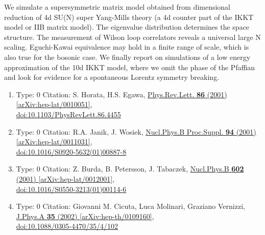 \documentclass[a4paper,10pt]{article}
\begin{document}
\begin{enumerate}
We simulate a supersymmetric matrix model obtained from dimensional reduction of 4d SU(N) super Yang-Mills theory (a 4d counter part of the IKKT model or IIB matrix model). The eigenvalue distribution determines the space structure. The measurement of Wilson loop correlators reveals a universal large N scaling. Eguchi-Kawai equivalence may hold in a finite range of scale, which is also true for the bosonic case. We finally report on simulations of a low energy approximation of the 10d IKKT model, where we omit the phase of the Pfaffian and look for evidence for a spontaneous Lorentz symmetry breaking.
\begin{enumerate}
  \item Type: 0 Citation: S. Horata, H.S. Egawa, \href{https://www.doi.org/10.1103/PhysRevLett.86.4455}{Phys.Rev.Lett. {\bf 86} (2001) }  \href{https://arxiv.org/abs/hep-lat/0010051}{[arXiv:hep-lat/0010051]},\\\href{https://www.doi.org/10.1103/PhysRevLett.86.4455}{doi:10.1103/PhysRevLett.86.4455}
  \item Type: 0 Citation: R.A. Janik, J. Wosiek, \href{https://www.doi.org/10.1016/S0920-5632(01)00887-8}{Nucl.Phys.B Proc.Suppl. {\bf 94} (2001) }  \href{https://arxiv.org/abs/hep-lat/0011031}{[arXiv:hep-lat/0011031]},\\\href{https://www.doi.org/10.1016/S0920-5632(01)00887-8}{doi:10.1016/S0920-5632(01)00887-8}
  \item Type: 0 Citation: Z. Burda, B. Petersson, J. Tabaczek, \href{https://www.doi.org/10.1016/S0550-3213(01)00114-6}{Nucl.Phys.B {\bf 602} (2001) }  \href{https://arxiv.org/abs/hep-lat/0012001}{[arXiv:hep-lat/0012001]},\\\href{https://www.doi.org/10.1016/S0550-3213(01)00114-6}{doi:10.1016/S0550-3213(01)00114-6}
  \item Type: 0 Citation: Giovanni M. Cicuta, Luca Molinari, Graziano Vernizzi, \href{https://www.doi.org/10.1088/0305-4470/35/4/102}{J.Phys.A {\bf 35} (2002) }  \href{https://arxiv.org/abs/hep-th/0109160}{[arXiv:hep-th/0109160]},\\\href{https://www.doi.org/10.1088/0305-4470/35/4/102}{doi:10.1088/0305-4470/35/4/102}

\end{enumerate}
\end{enumerate}
\end{document}
